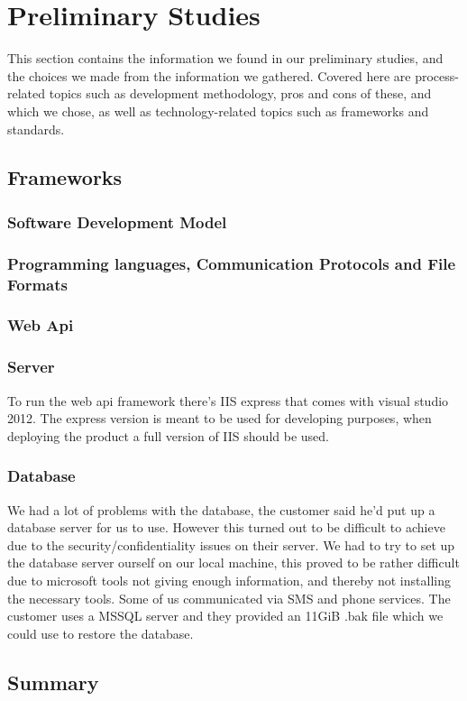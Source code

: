 \section{Preliminary Studies}
This section contains the information we found in our preliminary studies, and the choices we made from the information we gathered. Covered here are process-related topics such as development methodology, pros and cons of these, and which we chose, as well as technology-related topics such as frameworks and standards.


\newpage

\subsection{Frameworks}
\subsubsection{Software Development Model}
\subsubsection{Programming languages, Communication Protocols and File Formats}
\subsubsection{Web Api}
\subsubsection{Server}
To run the web api framework there's IIS express that comes with visual studio 2012. The express version is meant to be used for developing purposes, when deploying the product a full version of IIS should be used.
\subsubsection{Database}
We had a lot of problems with the database, the customer said he'd put up a database server for us to use. However this turned out to be difficult to achieve due to the security/confidentiality issues on their server. We had to try to set up the database server ourself on our local machine, this proved to be rather difficult due to microsoft tools not giving enough information, and thereby not installing the necessary tools. Some of us communicated via SMS and phone services.
The customer uses a MSSQL server and they provided an 11GiB .bak file which we could use to restore the database.


\subsection{Summary}